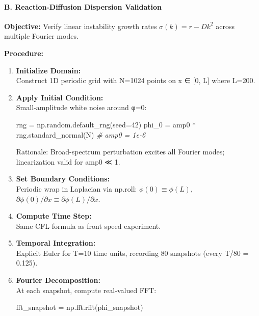 \documentclass[
]{article}
\newenvironment{Shaded}{}{}
\newcommand{\CommentTok}[1]{\textcolor[rgb]{0.38,0.63,0.69}{\textit{#1}}}
\newcommand{\DecValTok}[1]{\textcolor[rgb]{0.25,0.63,0.44}{#1}}
\newcommand{\NormalTok}[1]{#1}
\newcommand{\OperatorTok}[1]{\textcolor[rgb]{0.40,0.40,0.40}{#1}}
\begin{document}
\hypertarget{b.-reaction-diffusion-dispersion-validation}{%
\paragraph{B. Reaction-Diffusion Dispersion
Validation}\label{b.-reaction-diffusion-dispersion-validation}}

\textbf{Objective:} Verify linear instability growth rates
\(\sigma(k) = r - D k^{2}\) across multiple Fourier modes.

\textbf{Procedure:}

\begin{enumerate}
\def\labelenumi{\arabic{enumi}.}
\item
  \textbf{Initialize Domain:}\\
  Construct 1D periodic grid with N=1024 points on x ∈ {[}0, L{]} where
  L=200.
\item
  \textbf{Apply Initial Condition:}\\
  Small-amplitude white noise around φ=0:

\begin{Shaded}
\begin{Highlighting}[]
\NormalTok{rng }\OperatorTok{=}\NormalTok{ np.random.default\_rng(seed}\OperatorTok{=}\DecValTok{42}\NormalTok{)}
\NormalTok{phi\_0 }\OperatorTok{=}\NormalTok{ amp0 }\OperatorTok{*}\NormalTok{ rng.standard\_normal(N)  }\CommentTok{\# amp0 = 1e{-}6}
\end{Highlighting}
\end{Shaded}

  Rationale: Broad-spectrum perturbation excites all Fourier modes;
  linearization valid for amp0 ≪ 1.
\item
  \textbf{Set Boundary Conditions:}\\
  Periodic wrap in Laplacian via np.roll: \(\phi(0) \equiv \phi(L)\),
  \(\partial\phi(0)/\partial x \equiv \partial\phi(L)/\partial x\).
\item
  \textbf{Compute Time Step:}\\
  Same CFL formula as front speed experiment.
\item
  \textbf{Temporal Integration:}\\
  Explicit Euler for T=10 time units, recording 80 snapshots (every T/80
  = 0.125).
\item
  \textbf{Fourier Decomposition:}\\
  At each snapshot, compute real-valued FFT:

\begin{Shaded}
\begin{Highlighting}[]
\NormalTok{fft\_snapshot }\OperatorTok{=}\NormalTok{ np.fft.rfft(phi\_snapshot)}
\end{Highlighting}
\end{Shaded}


\end{enumerate}
\end{document}
